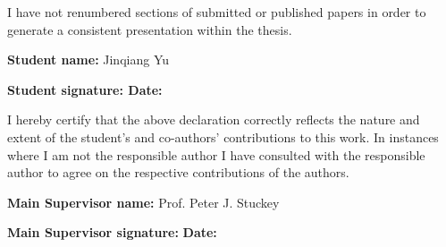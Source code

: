 I have not renumbered sections of submitted or published papers
in order to generate a consistent presentation within the thesis.

\textbf{Student name:} Jinqiang Yu

\textbf{Student signature: \hfill Date:}

I hereby certify that the above declaration correctly reflects the
nature and extent of the student's and co-authors' contributions to this
work. In instances where I am not the responsible author I have
consulted with the responsible author to agree on the respective
contributions of the authors.

\textbf{Main Supervisor name:} Prof. Peter J. Stuckey 

\textbf{Main Supervisor signature:} \hfill \textbf{Date:}



